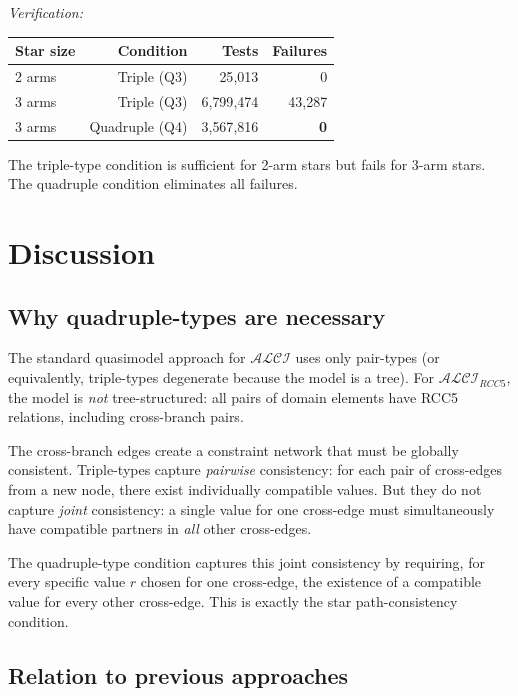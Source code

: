 \documentclass[a4paper,11pt]{article}
\theoremstyle{definition}
\newcommand{\ALCI}{\ensuremath{\mathcal{ALCI}}}
\newcommand{\ALCIRCC}[1]{\ensuremath{\mathcal{ALCI}_{\mathit{RCC#1}}}}
\begin{document}
\emph{Verification:}\;
\begin{center}
\renewcommand{\arraystretch}{1.2}
\begin{tabular}{lrrr}
\toprule
\textbf{Star size} & \textbf{Condition} & \textbf{Tests} & \textbf{Failures} \\
\midrule
2 arms & Triple (Q3) & 25{,}013 & 0 \\
3 arms & Triple (Q3) & 6{,}799{,}474 & 43{,}287 \\
3 arms & Quadruple (Q4) & 3{,}567{,}816 & \textbf{0} \\
\bottomrule
\end{tabular}
\end{center}

The triple-type condition is sufficient for 2-arm stars but
fails for 3-arm stars.  The quadruple condition eliminates
all failures.


\section{Discussion}
\label{sec:discussion}

\subsection{Why quadruple-types are necessary}

The standard quasimodel approach for $\ALCI$ uses only pair-types
(or equivalently, triple-types degenerate because the model is a
tree).  For $\ALCIRCC{5}$, the model is \emph{not} tree-structured:
all pairs of domain elements have RCC5 relations, including
cross-branch pairs.

The cross-branch edges create a constraint network that must be
globally consistent.  Triple-types capture \emph{pairwise}
consistency: for each pair of cross-edges from a new node, there
exist individually compatible values.  But they do not capture
\emph{joint} consistency: a single value for one cross-edge must
simultaneously have compatible partners in \emph{all} other
cross-edges.

The quadruple-type condition captures this joint consistency
by requiring, for every specific value $r$ chosen for one
cross-edge, the existence of a compatible value for every other
cross-edge.  This is exactly the star path-consistency condition.

\subsection{Relation to previous approaches}
\end{document}
